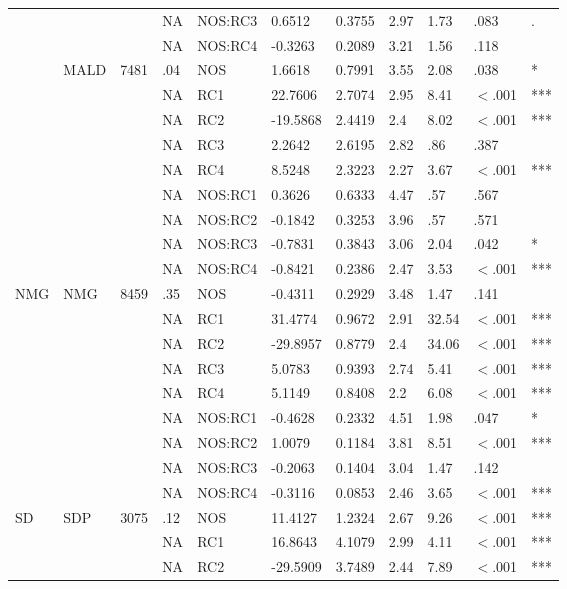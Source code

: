 \begin{table}[ht]
\begin{tabular}{lllllllllll}
   &  &  & NA & NOS:RC3 & 0.6512 & 0.3755 & 2.97 & 1.73 & .083 & . \\ 
   &  &  & NA & NOS:RC4 & -0.3263 & 0.2089 & 3.21 & 1.56 & .118 &   \\ 
   & MALD & 7481 & .04 & NOS & 1.6618 & 0.7991 & 3.55 & 2.08 & .038 & * \\ 
   &  &  & NA & RC1 & 22.7606 & 2.7074 & 2.95 & 8.41 & $<$.001 & *** \\ 
   &  &  & NA & RC2 & -19.5868 & 2.4419 & 2.4 & 8.02 & $<$.001 & *** \\ 
   &  &  & NA & RC3 & 2.2642 & 2.6195 & 2.82 & .86 & .387 &   \\ 
   &  &  & NA & RC4 & 8.5248 & 2.3223 & 2.27 & 3.67 & $<$.001 & *** \\ 
   &  &  & NA & NOS:RC1 & 0.3626 & 0.6333 & 4.47 & .57 & .567 &   \\ 
   &  &  & NA & NOS:RC2 & -0.1842 & 0.3253 & 3.96 & .57 & .571 &   \\ 
   &  &  & NA & NOS:RC3 & -0.7831 & 0.3843 & 3.06 & 2.04 & .042 & * \\ 
   &  &  & NA & NOS:RC4 & -0.8421 & 0.2386 & 2.47 & 3.53 & $<$.001 & *** \\ 
  NMG & NMG & 8459 & .35 & NOS & -0.4311 & 0.2929 & 3.48 & 1.47 & .141 &   \\ 
   &  &  & NA & RC1 & 31.4774 & 0.9672 & 2.91 & 32.54 & $<$.001 & *** \\ 
   &  &  & NA & RC2 & -29.8957 & 0.8779 & 2.4 & 34.06 & $<$.001 & *** \\ 
   &  &  & NA & RC3 & 5.0783 & 0.9393 & 2.74 & 5.41 & $<$.001 & *** \\ 
   &  &  & NA & RC4 & 5.1149 & 0.8408 & 2.2 & 6.08 & $<$.001 & *** \\ 
   &  &  & NA & NOS:RC1 & -0.4628 & 0.2332 & 4.51 & 1.98 & .047 & * \\ 
   &  &  & NA & NOS:RC2 & 1.0079 & 0.1184 & 3.81 & 8.51 & $<$.001 & *** \\ 
   &  &  & NA & NOS:RC3 & -0.2063 & 0.1404 & 3.04 & 1.47 & .142 &   \\ 
   &  &  & NA & NOS:RC4 & -0.3116 & 0.0853 & 2.46 & 3.65 & $<$.001 & *** \\ 
  SD & SDP & 3075 & .12 & NOS & 11.4127 & 1.2324 & 2.67 & 9.26 & $<$.001 & *** \\ 
   &  &  & NA & RC1 & 16.8643 & 4.1079 & 2.99 & 4.11 & $<$.001 & *** \\ 
   &  &  & NA & RC2 & -29.5909 & 3.7489 & 2.44 & 7.89 & $<$.001 & *** \\ 

\end{tabular}
\end{table}
